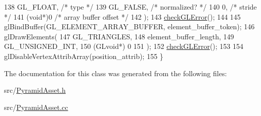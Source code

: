 \begin{DoxyCode}
138     GL\_FLOAT,   \textcolor{comment}{/* type */}
139     GL\_FALSE,   \textcolor{comment}{/* normalized? */}
140     0,        \textcolor{comment}{/* stride */}
141     (\textcolor{keywordtype}{void}*)0    \textcolor{comment}{/* array buffer offset */}
142   );
143   \hyperlink{PyramidAsset_8cc_a75f201b0e53e68726854997957322b8d}{checkGLError}();
144 
145   glBindBuffer(GL\_ELEMENT\_ARRAY\_BUFFER, element\_buffer\_token);
146   glDrawElements(
147     GL\_TRIANGLES,
148     element\_buffer\_length,
149     GL\_UNSIGNED\_INT,
150     (GLvoid*) 0
151   );
152   \hyperlink{PyramidAsset_8cc_a75f201b0e53e68726854997957322b8d}{checkGLError}();
153 
154   glDisableVertexAttribArray(position\_attrib);
155 \}
\end{DoxyCode}


The documentation for this class was generated from the following files\+:\begin{DoxyCompactItemize}
\item 
src/\hyperlink{PyramidAsset_8h}{Pyramid\+Asset.\+h}\item 
src/\hyperlink{PyramidAsset_8cc}{Pyramid\+Asset.\+cc}\end{DoxyCompactItemize}
